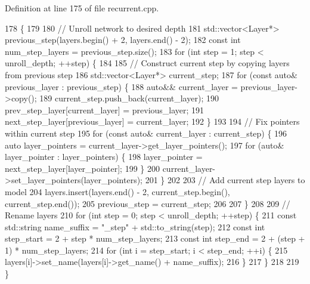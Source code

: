 Definition at line 175 of file recurrent.\+cpp.


\begin{DoxyCode}
178                                                                                  \{
179 
180   \textcolor{comment}{// Unroll network to desired depth}
181   std::vector<Layer*> previous\_step(layers.begin() + 2, layers.end() - 2);
182   \textcolor{keyword}{const} \textcolor{keywordtype}{int} num\_step\_layers = previous\_step.size();
183   \textcolor{keywordflow}{for} (\textcolor{keywordtype}{int} step = 1; step < unroll\_depth; ++step) \{
184     
185     \textcolor{comment}{// Construct current step by copying layers from previous step}
186     std::vector<Layer*> current\_step;
187     \textcolor{keywordflow}{for} (\textcolor{keyword}{const} \textcolor{keyword}{auto}& previous\_layer : previous\_step) \{
188       \textcolor{keyword}{auto}&& current\_layer = previous\_layer->copy();
189       current\_step.push\_back(current\_layer);
190       prev\_step\_layer[current\_layer] = previous\_layer;
191       next\_step\_layer[previous\_layer] = current\_layer;
192     \}
193 
194     \textcolor{comment}{// Fix pointers within current step}
195     \textcolor{keywordflow}{for} (\textcolor{keyword}{const} \textcolor{keyword}{auto}& current\_layer : current\_step) \{
196       \textcolor{keyword}{auto} layer\_pointers = current\_layer->get\_layer\_pointers();
197       \textcolor{keywordflow}{for} (\textcolor{keyword}{auto}& layer\_pointer : layer\_pointers) \{
198         layer\_pointer = next\_step\_layer[layer\_pointer];
199       \}
200       current\_layer->set\_layer\_pointers(layer\_pointers);
201     \}
202 
203     \textcolor{comment}{// Add current step layers to model}
204     layers.insert(layers.end() - 2, current\_step.begin(), current\_step.end());
205     previous\_step = current\_step;
206 
207   \}
208 
209   \textcolor{comment}{// Rename layers}
210   \textcolor{keywordflow}{for} (\textcolor{keywordtype}{int} step = 0; step < unroll\_depth; ++step) \{
211     \textcolor{keyword}{const} std::string name\_suffix = \textcolor{stringliteral}{"\_step"} + std::to\_string(step);
212     \textcolor{keyword}{const} \textcolor{keywordtype}{int} step\_start = 2 + step * num\_step\_layers;
213     \textcolor{keyword}{const} \textcolor{keywordtype}{int} step\_end = 2 + (step + 1) * num\_step\_layers;
214     \textcolor{keywordflow}{for} (\textcolor{keywordtype}{int} i = step\_start; i < step\_end; ++i) \{
215       layers[i]->set\_name(layers[i]->get\_name() + name\_suffix);
216     \}
217   \}
218   
219 \}
\end{DoxyCode}

